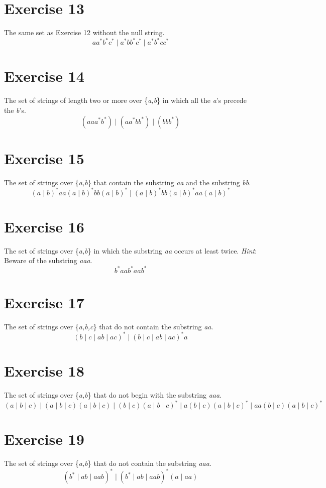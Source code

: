 \documentclass{report}
\begin{document}
\section*{Exercise 13}
The same set as Exercise 12 without the null string.
\newline
$$aa^*b^*c^* \mid a^*bb^*c^* \mid a^*b^*cc^*$$
\section*{Exercise 14}
The set of strings of length two or more over \{\textit{a,b}\} in which all the \textit{a}'s precede the \textit{b}'s.
\newline
$$(aaa^*b^*) \mid (aa^*bb^*) \mid (bbb^*)$$
\section*{Exercise 15}
The set of strings over \{\textit{a,b}\} that contain the substring \textit{aa} and the substring \textit{bb}.
\newline
$$(a \mid b)^*aa(a \mid b)^*bb(a \mid b)^* \mid (a \mid b)^*bb(a \mid b)^*aa(a \mid b)^*$$

\newpage

\section*{Exercise 16}
The set of strings over \{\textit{a,b}\} in which the substring \textit{aa} occurs at least twice. \textit{Hint}: Beware of the substring \textit{aaa}.
\newline
$$b^*aab^*aab^*$$
\section*{Exercise 17}
The set of strings over \{\textit{a,b,c}\} that do not contain the substring \textit{aa}.
\newline
$$(b \mid c \mid ab \mid ac)^* \mid (b \mid c \mid ab \mid ac)^*a$$
\section*{Exercise 18}
The set of strings over \{\textit{a,b}\} that do not begin with the substring \textit{aaa}.
\newline
$$(a \mid b \mid c) \mid (a \mid b \mid c)(a \mid b \mid c) \mid (b \mid c)(a \mid b \mid c)^* \mid a(b \mid c)(a \mid b \mid c)^* \mid aa(b \mid c)(a \mid b \mid c)^*$$
\section*{Exercise 19}
The set of strings over \{\textit{a,b}\} that do not contain the substring \textit{aaa}.
\newline
$$(b^* \mid ab \mid aab)^* \mid (b^* \mid ab \mid aab)^*(a \mid aa)$$
\end{document}
